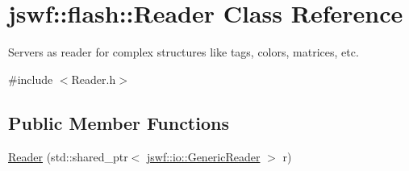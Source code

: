 \hypertarget{classjswf_1_1flash_1_1_reader}{\section{jswf\+:\+:flash\+:\+:Reader Class Reference}
\label{classjswf_1_1flash_1_1_reader}
}


Servers as reader for complex structures like tags, colors, matrices, etc.  




{\ttfamily \#include $<$Reader.\+h$>$}

\subsection*{Public Member Functions}
\begin{DoxyCompactItemize}
\item 
\hypertarget{classjswf_1_1flash_1_1_reader_ac5e07ac1401d7686dfa57b728c7942f3}{\hyperlink{classjswf_1_1flash_1_1_reader_ac5e07ac1401d7686dfa57b728c7942f3}{Reader} (std\+::shared\+\_\+ptr$<$ \hyperlink{classjswf_1_1io_1_1_generic_reader}{jswf\+::io\+::\+Generic\+Reader} $>$ r)}\label{classjswf_1_1flash_1_1_reader_ac5e07ac1401d7686dfa57b728c7942f3}


\end{DoxyCompactItemize}
